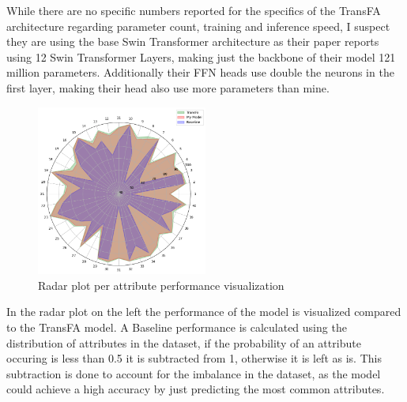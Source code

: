 \documentclass[a4paper,oneside]{article}
\begin{document}
While there are no specific numbers reported for the specifics of the TransFA architecture regarding parameter count, training and inference speed,
I suspect they are using the base Swin Transformer architecture as their paper reports using 12 Swin Transformer Layers, making just the backbone of their model 121 million parameters.
Additionally their FFN heads use double the neurons in the first layer, making their head also use more parameters than mine.

\begin{figure}
  \includegraphics[width=0.5\textwidth]{radarplot.png}
  \centering
  \caption[Radar plot]{Radar plot per attribute performance visualization\footnotemark}
  \centering
\end{figure}


In the radar plot on the left the performance of the model is visualized compared to the TransFA model.
A Baseline performance is calculated using the distribution of attributes in the dataset, if the probability of an attribute occuring is less than 0.5 it is subtracted from 1, otherwise it is left as is.
This subtraction is done to account for the imbalance in the dataset, as the model could achieve a high accuracy by just predicting the most common attributes.
\end{document}
